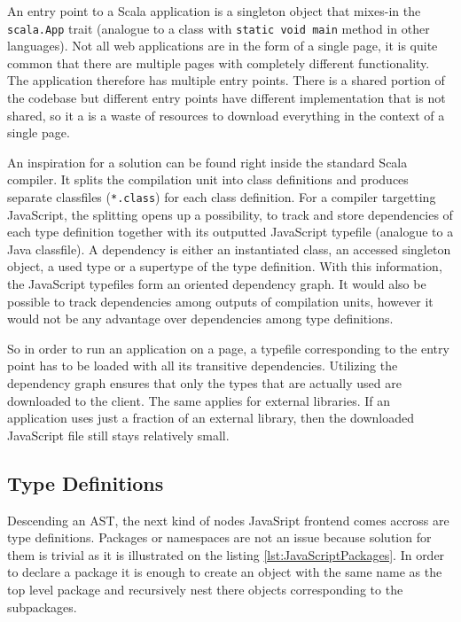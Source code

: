 \documentclass[12pt,a4paper]{report}
\begin{document}
An entry point to a Scala application is a singleton object that mixes-in the \texttt{scala.App} trait (analogue to a class with \texttt{static void main} method in other languages). Not all web applications are in the form of a single page, it is quite common that there are multiple pages with completely different functionality. The application therefore has multiple entry points. There is a shared portion of the codebase but different entry points have different implementation that is not shared, so it a is a waste of resources to download everything in the context of a single page.

An inspiration for a solution can be found right inside the standard Scala compiler. It splits the compilation unit into class definitions and produces separate classfiles (\texttt{*.class}) for each class definition. For a compiler targetting JavaScript, the splitting opens up a possibility, to track and store dependencies of each type definition together with its outputted JavaScript typefile (analogue to a Java classfile). A dependency is either an instantiated class, an accessed singleton object, a used type or a supertype of the type definition. With this information, the JavaScript typefiles form an oriented dependency graph. It would also be possible to track dependencies among outputs of compilation units, however it would not be any advantage over dependencies among type definitions.

So in order to run an application on a page, a typefile corresponding to the entry point has to be loaded with all its transitive dependencies. Utilizing the dependency graph ensures that only the types that are actually used are downloaded to the client. The same applies for external libraries. If an application uses just a fraction of an external library, then the downloaded JavaScript file still stays relatively small.

\subsection{Type Definitions}

Descending an AST, the next kind of nodes JavaSript frontend comes accross are type definitions. Packages or namespaces are not an issue because solution for them is trivial as it is illustrated on the listing \ref{lst:JavaScriptPackages}. In order to declare a package it is enough to create an object with the same name as the top level package and recursively nest there objects corresponding to the subpackages.
\end{document}
